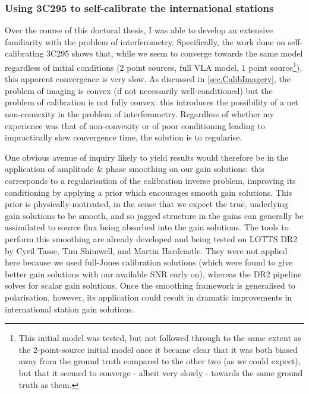 \subsubsection{Using 3C295 to self-calibrate the international stations}

\pg
Over the course of this doctoral thesis, I was able to develop an extensive familiarity with the problem of interferometry. Specifically, the work done on self-calibrating 3C295 shows that, while we seem to converge towards the same model regardless of initial conditions (2 point sources, full VLA model, 1 point source\footnote{This initial model was tested, but not followed through to the same extent as the 2-point-source initial model once it became clear that it was both biased away from the ground truth compared to the other two (as we could expect), but that it seemed to converge - albeit very slowly - towards the same ground truth as them.}), this apparent convergence is very slow. As discussed in \cref{sec.CalibImagery}, the problem of imaging is convex (if not necessarily well-conditioned) but the problem of calibration is not fully convex: this introduces the possibility of a net non-convexity in the problem of interferometry. Regardless of whether my experience was that of non-convexity or of poor conditioning leading to impractically slow convergence time, the solution is to regularise.

\pg
One obvious avenue of inquiry likely to yield results would therefore be in the application of amplitude \& phase smoothing on our gain solutions: this corresponds to a regularisation of the calibration inverse problem, improving its conditioning by applying a prior which encourages smooth gain solutions. This prior is physically-motivated, in the sense that we expect the true, underlying gain solutions to be smooth, and so jagged structure in the gains can generally be assimilated to source flux being absorbed into the gain solutions. The tools to perform this smoothing are already developed and being tested on LOTTS DR2 by Cyril Tasse, Tim Shimwell, and Martin Hardcastle. They were not applied here because we used full-Jones calibration solutions (which were found to give better gain solutions with our available SNR early on), whereas the DR2 pipeline solves for scalar gain solutions. Once the smoothing framework is generalised to polarisation, however, its application could result in dramatic improvements in international station gain solutions.


